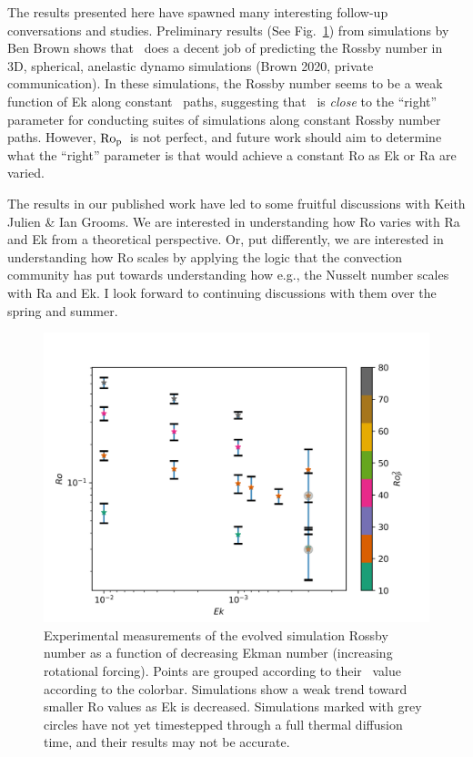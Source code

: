 The results presented here have spawned many interesting follow-up conversations and studies.
Preliminary results (See Fig.~\ref{fig:ro_ek}) from simulations by Ben Brown shows that \pro$\,$ does a decent job of predicting the Rossby number in 3D, spherical, anelastic dynamo simulations (Brown 2020, private communication).
In these simulations, the Rossby number seems to be a weak function of Ek along constant \pro$\,$ paths, suggesting that \pro$\,$ is \emph{close} to the ``right'' parameter for conducting suites of simulations along constant Rossby number paths.
However, $\text{Ro}_{\text{p}}\,$ is not perfect, and future work should aim to determine what the ``right'' parameter is that would achieve a constant Ro as Ek or Ra are varied.

The results in our published work have led to some fruitful discussions with Keith Julien \& Ian Grooms.
We are interested in understanding how Ro varies with Ra and Ek from a theoretical perspective.
Or, put differently, we are interested in understanding how Ro scales by applying the logic that the \RB convection community has put towards understanding how e.g., the Nusselt number scales with Ra and Ek.
I look forward to continuing discussions with them over the spring and summer.

\begin{figure}[b!]
    \includegraphics[width=\textwidth]{./figs/postscripts/Ro_Ek.pdf}
    \caption[Initial \pro$\,$ results in spherical simulations]
	{
	Experimental measurements of the evolved simulation Rossby number as a function of decreasing Ekman number (increasing rotational forcing).
	Points are grouped according to their \pro$\,$ value according to the colorbar.
	Simulations show a weak trend toward smaller Ro values as Ek is decreased.
	Simulations marked with grey circles have not yet timestepped through a full thermal diffusion time, and their results may not be accurate.
    \label{fig:ro_ek} }
\end{figure}



